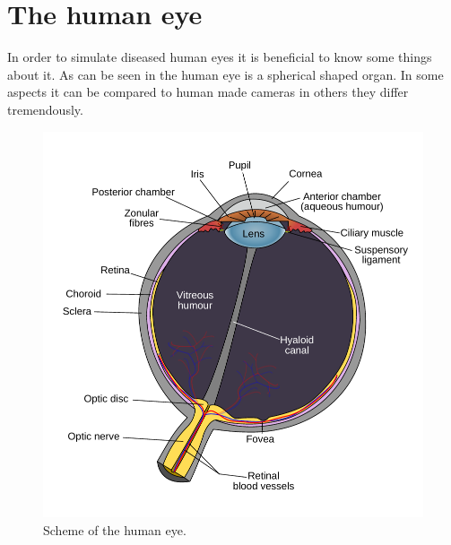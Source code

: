 \documentclass{acm_proc_article-sp}
\begin{document}
\section{The human eye}
In order to simulate diseased human eyes it is beneficial to know some things about it.
As can be seen in  the human eye is a spherical shaped organ.
In some aspects it can be compared to human made cameras in others they differ tremendously.

\begin{figure}
    \centering
    \includegraphics[width=\columnwidth]{human_eye_scheme.pdf}
    \caption{Scheme of the human eye.}
    \label{fig:humaneye}
\end{figure}
\end{document}
